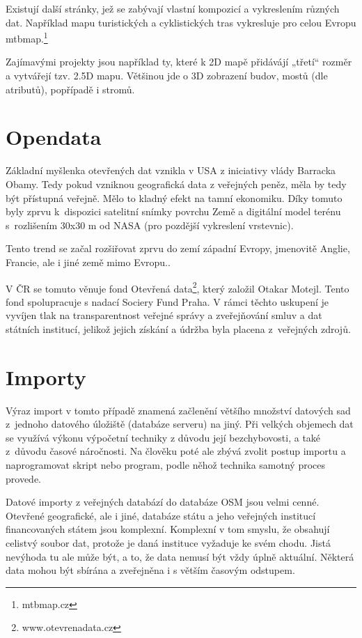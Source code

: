 Existují další stránky, jež se zabývají vlastní kompozicí a vykreslením
různých dat. Například mapu turistických a cyklistických tras vykresluje
pro celou Evropu mtbmap.\footnote{mtbmap.cz}

Zajímavými projekty jsou například ty, které k 2D mapě přidávájí „třetí“ rozměr a
vytvářejí tzv. 2.5D mapu. Většinou jde o 3D zobrazení budov, mostů (dle
atributů), popřípadě i stromů.

\section{Opendata}
\label{opendata}
Základní myšlenka otevřených dat vznikla v USA z iniciativy vlády Barracka Obamy.
Tedy pokud vzniknou geografická data z veřejných peněz, měla by tedy být
přístupná veřejně. Mělo to kladný efekt na tamní ekonomiku. Díky tomuto byly
zprvu k~dispozici satelitní snímky povrchu Země a digitální model terénu
s~rozlišením 30x30 m od NASA (pro pozdější vykreslení vrstevnic).

Tento trend se začal rozšiřovat zprvu do zemí západní Evropy,
jmenovitě Anglie, Francie, ale i jiné země mimo Evropu..

V ČR se tomuto věnuje fond Otevřená data\footnote{www.otevrenadata.cz}, který založil Otakar
Motejl. Tento fond spolupracuje s nadací Sociery Fund Praha. V rámci
těchto uskupení je vyvíjen tlak na transparentnost veřejné správy a
zveřejňování smluv a dat
státních institucí, jelikož jejich získání a údržba byla placena
z~veřejných zdrojů.



\section{Importy}
\label{Importy}
Výraz import v tomto případě znamená začlenění většího množství datových sad
z~jednoho datového úložiště (databáze serveru) na jiný. Při velkých objemech dat
se využívá výkonu výpočetní techniky z důvodu její bezchybovosti, a také
z~důvodu časové náročnosti. Na člověku poté ale zbývá zvolit postup importu
a naprogramovat skript nebo program, podle něhož technika samotný proces
provede. 

Datové importy z veřejných databází do databáze OSM jsou velmi cenné. 
Otevřené geografické, ale i jiné, databáze státu a jeho veřejných institucí 
financovaných státem jsou komplexní. Komplexní v tom smyslu, že obsahují celistvý
soubor dat, protože je daná instituce vyžaduje ke svém chodu. Jistá nevýhoda tu 
ale může být, a to, že data nemusí být vždy úplně aktuální. Některá data mohou 
být sbírána a zveřejněna i s větším časovým odstupem.

